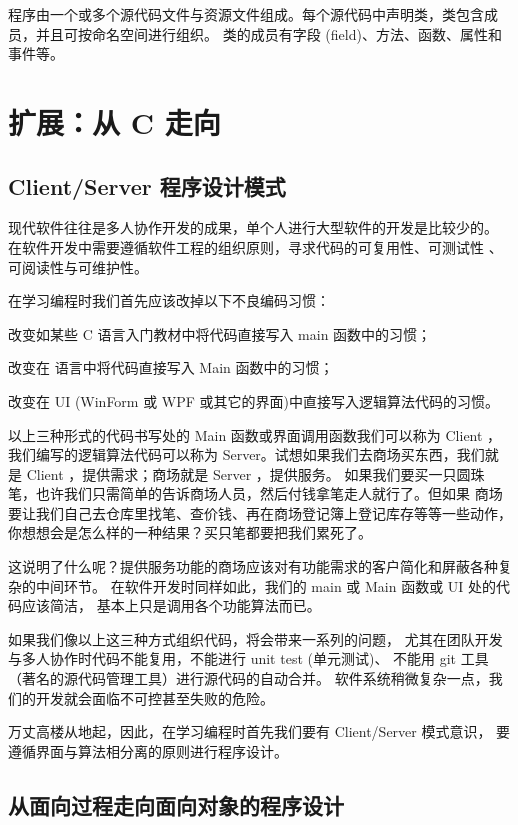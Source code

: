 \cs  程序由一个或多个源代码文件与资源文件组成。每个源代码中声明类，类包含成员，并且可按命名空间进行组织。
类的成员有字段 (field)、方法、函数、属性和事件等。



\section{扩展：从 C 走向\cs}

\subsection{Client/Server 程序设计模式}
现代软件往往是多人协作开发的成果，单个人进行大型软件的开发是比较少的。
在软件开发中需要遵循软件工程的组织原则，寻求代码的可复用性、可测试性
、可阅读性与可维护性。

在学习编程时我们首先应该改掉以下不良编码习惯：

改变如某些 C 语言入门教材中将代码直接写入 main 函数中的习惯；

改变在 \cs 语言中将代码直接写入 Main 函数中的习惯；

改变在 UI (WinForm 或 WPF 或其它的界面)中直接写入逻辑算法代码的习惯。

以上三种形式的代码书写处的 Main 函数或界面调用函数我们可以称为 Client ，我们编写的逻辑算法代码可以称为
Server。试想如果我们去商场买东西，我们就是 Client ，提供需求；商场就是 Server ，提供服务。
如果我们要买一只圆珠笔，也许我们只需简单的告诉商场人员，然后付钱拿笔走人就行了。但如果
商场要让我们自己去仓库里找笔、查价钱、再在商场登记簿上登记库存等等一些动作，
你想想会是怎么样的一种结果？买只笔都要把我们累死了。

这说明了什么呢？提供服务功能的商场应该对有功能需求的客户简化和屏蔽各种复杂的中间环节。
在软件开发时同样如此，我们的 main 或 Main 函数或 UI 处的代码应该简洁，
基本上只是调用各个功能算法而已。

如果我们像以上这三种方式组织代码，将会带来一系列的问题，
尤其在团队开发与多人协作时代码不能复用，不能进行 unit test (单元测试)、
不能用 git 工具（著名的源代码管理工具）进行源代码的自动合并。
软件系统稍微复杂一点，我们的开发就会面临不可控甚至失败的危险。

万丈高楼从地起，因此，在学习编程时首先我们要有 Client/Server 模式意识，
要遵循界面与算法相分离的原则进行程序设计。

\subsection{从面向过程走向面向对象的程序设计 }

